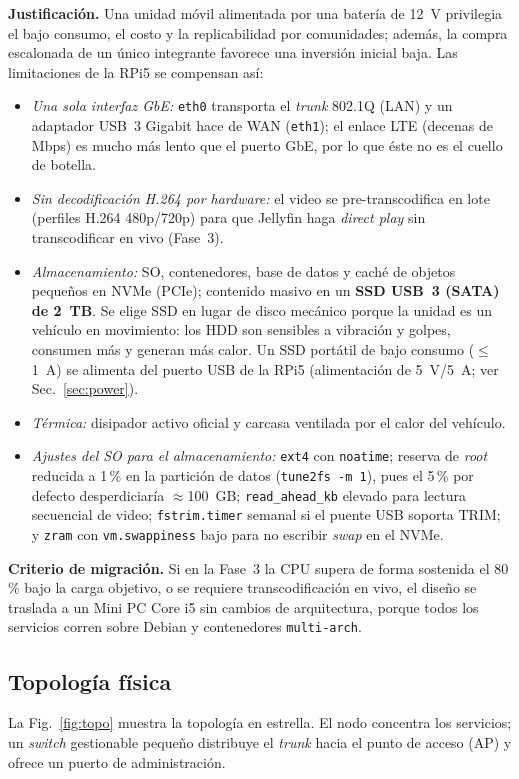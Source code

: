 \documentclass[conference]{IEEEtran}
\begin{document}
\textbf{Justificación.} Una unidad móvil alimentada por una batería de 12~V privilegia el bajo consumo, el costo y la replicabilidad por comunidades; además, la compra escalonada de un único integrante favorece una inversión inicial baja. Las limitaciones de la RPi5 se compensan así:
\begin{itemize}
  \item \textit{Una sola interfaz GbE:} \texttt{eth0} transporta el \textit{trunk} 802.1Q (LAN) y un adaptador USB~3 Gigabit hace de WAN (\texttt{eth1}); el enlace LTE (decenas de Mbps) es mucho más lento que el puerto GbE, por lo que éste no es el cuello de botella.
  \item \textit{Sin decodificación H.264 por hardware:} el video se pre-transcodifica en lote (perfiles H.264 480p/720p) para que Jellyfin haga \textit{direct play} sin transcodificar en vivo (Fase~3).
  \item \textit{Almacenamiento:} SO, contenedores, base de datos y caché de objetos pequeños en NVMe (PCIe); contenido masivo en un \textbf{SSD USB~3 (SATA) de 2~TB}. Se elige SSD en lugar de disco mecánico porque la unidad es un vehículo en movimiento: los HDD son sensibles a vibración y golpes, consumen más y generan más calor. Un SSD portátil de bajo consumo ($\le$1~A) se alimenta del puerto USB de la RPi5 (alimentación de 5~V/5~A; ver Sec.~\ref{sec:power}).
  \item \textit{Térmica:} disipador activo oficial y carcasa ventilada por el calor del vehículo.
  \item \textit{Ajustes del SO para el almacenamiento:} \texttt{ext4} con \texttt{noatime}; reserva de \textit{root} reducida a 1\,\% en la partición de datos (\texttt{tune2fs -m 1}), pues el 5\,\% por defecto desperdiciaría $\approx$100~GB; \texttt{read\_ahead\_kb} elevado para lectura secuencial de video; \texttt{fstrim.timer} semanal si el puente USB soporta TRIM; y \texttt{zram} con \texttt{vm.swappiness} bajo para no escribir \textit{swap} en el NVMe.
\end{itemize}

\textbf{Criterio de migración.} Si en la Fase~3 la CPU supera de forma sostenida el 80\,\% bajo la carga objetivo, o se requiere transcodificación en vivo, el diseño se traslada a un Mini PC Core i5 sin cambios de arquitectura, porque todos los servicios corren sobre Debian y contenedores \texttt{multi-arch}.

\subsection{Topología física}\label{sec:topo}
La Fig.~\ref{fig:topo} muestra la topología en estrella. El nodo concentra los servicios; un \textit{switch} gestionable pequeño distribuye el \textit{trunk} hacia el punto de acceso (AP) y ofrece un puerto de administración.
\end{document}
